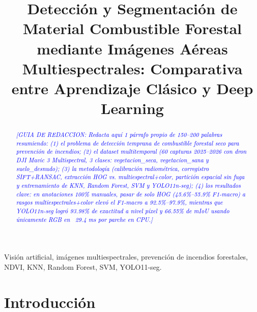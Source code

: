 \documentclass[conference]{IEEEtran}
\newcommand{\guia}[1]{\textcolor{blue}{\textit{[GUIA DE REDACCION: #1]}}}
\begin{document}
\title{Detección y Segmentación de Material Combustible Forestal mediante Imágenes Aéreas Multiespectrales: Comparativa entre Aprendizaje Clásico y Deep Learning}

\author{
}

\maketitle

\begin{abstract}
\guia{Redacta aquí 1 párrafo propio de 150--200 palabras resumiendo:
(1) el problema de detección temprana de combustible forestal seco para prevención de incendios;
(2) el dataset multitemporal (60 capturas 2025--2026 con dron DJI Mavic 3 Multispectral, 3 clases: vegetacion\_seca, vegetacion\_sana y suelo\_desnudo);
(3) la metodología (calibración radiométrica, corregistro SIFT+RANSAC, extracción HOG vs. multiespectral+color, partición espacial sin fuga y entrenamiento de KNN, Random Forest, SVM y YOLO11n-seg);
(4) los resultados clave: en anotaciones 100\% manuales, pasar de solo HOG (45.6\%--55.9\% F1-macro) a rasgos multiespectrales+color elevó el F1-macro a 92.5\%--97.9\%, mientras que YOLO11n-seg logró 93.98\% de exactitud a nivel píxel y 66.55\% de mIoU usando únicamente RGB en ~29.4 ms por parche en CPU.}
\end{abstract}

\begin{IEEEkeywords}
Visión artificial, imágenes multiespectrales, prevención de incendios forestales, NDVI, KNN, Random Forest, SVM, YOLO11-seg.
\end{IEEEkeywords}

\section{Introducción}
\end{document}
